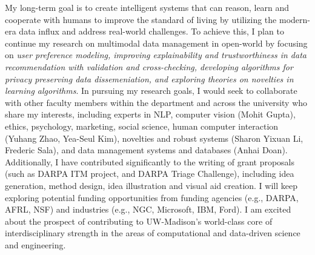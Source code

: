 \documentclass[11pt]{article}
\begin{document}
My long-term goal is to create intelligent systems that can reason, learn and cooperate with humans to improve the standard of living by utilizing the 
modern-era data influx
and address real-world challenges.
To achieve this, I plan to continue my research on multimodal data management in open-world by focusing on \textit{user preference modeling, improving explainability and trustworthiness in data recommendation with validation and cross-checking, developing algorithms for privacy preserving data dissemeniation, and exploring theories on novelties in learning algorithms}. 
In pursuing my research goals, I would seek to collaborate with other faculty members within the department and across the university who share my interests, including experts in NLP, computer vision (Mohit Gupta), ethics, psychology, marketing, social science, human computer interaction (Yuhang Zhao, Yea-Seul Kim), novelties and robust systems (Sharon Yixuan Li, Frederic Sala), and data management systems and databases (Anhai Doan). 
Additionally, I have contributed significantly to the writing of grant proposals (such as DARPA ITM project, and DARPA Triage Challenge), including idea generation, method design, idea illustration and visual aid creation. I will keep exploring potential funding opportunities from funding agencies (e.g., DARPA, AFRL, NSF)
and industries (e.g., NGC, Microsoft, IBM, Ford).
I am excited about the prospect of contributing to UW-Madison's world-class core of interdisciplinary strength in the areas of computational and data-driven science and engineering.
\end{document}
